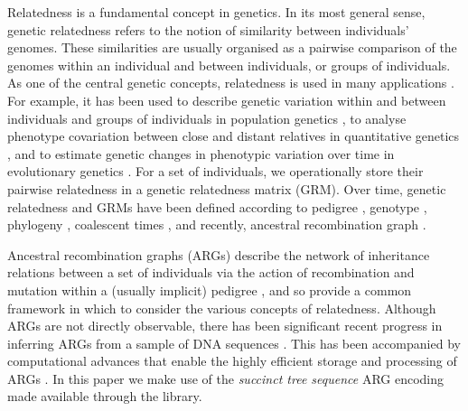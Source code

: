 

Relatedness is a fundamental concept in genetics.
%
In its most general sense, genetic relatedness refers to the notion of
similarity between individuals' genomes.
%
These similarities are usually organised as a pairwise comparison of the
genomes within an individual and between individuals, or groups of
individuals.
%
As one of the central genetic concepts, relatedness is used in many
applications \citep{weir2006genetic, speed2015relatedness}.
%
For example, it has been used to describe genetic variation within and between individuals
and groups of individuals in population genetics
\citep{crow2009introduction, charlesworth2010elements},
to analyse phenotype covariation between close and distant relatives in
quantitative genetics \citep{falconer1996introduction, lynch1998genetics},
and to estimate genetic changes in phenotypic variation over time in
evolutionary genetics \citep{walsh2018evolution, arnold2023evolutionary}.
%
For a set of individuals, we operationally store their pairwise relatedness in
a genetic relatedness matrix (GRM).
%
Over time, genetic relatedness and GRMs have been defined according to
pedigree \citep{fisher1919correlation, wright1922coefficients},
genotype \citep{cotterman1940calculus, malecot1948mathematiques, malecot1969mathemathics},
phylogeny \citep{felsenstein1985phylogenies,lynch1991methods},
coalescent times \citep{slatkin1991inbreeding}, and
recently, ancestral recombination graph \citep{tsambos2022efficient, fan2022genealogical, zhang2023biobank}.
%
    
Ancestral recombination graphs (ARGs) 
describe the network of inheritance relations between a set of individuals
via the action of recombination and mutation within a (usually implicit) pedigree
\citep{brandt2024promise, lewanski2024era, wong2023general, nielsen2024inference},
and so provide a common framework in which to consider
the various concepts of relatedness.
%
Although ARGs are not directly observable,
there has been significant recent progress in inferring ARGs from a sample of DNA sequences
\citep{rasmussen2014genome,speidel2019method, kelleher2019inferring, zhang2023biobank, deng2024robust, gunnarsson2024scalable}.
%
This has been accompanied by computational advances that enable
the highly efficient storage and processing of ARGs
\citep{kelleher2016efficient, zhu2024variance, dehaas2024enabling}.
%
In this paper we make use of the \textit{succinct tree sequence} 
ARG encoding \citep{ralph2020efficiently, wong2023general}
made available through the \tskit{} library.

